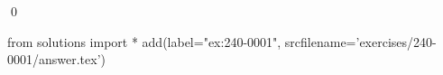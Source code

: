 
\begin{ex} 
  \label{ex:240-0001}
  
  \qed
\end{ex} 
\begin{python0}
from solutions import *
add(label="ex:240-0001",
    srcfilename='exercises/240-0001/answer.tex') 
\end{python0}
